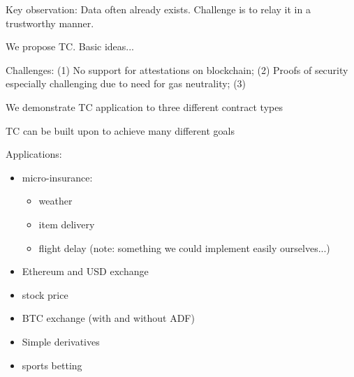 Key observation: Data often already exists. Challenge is to relay it in a trustworthy manner.

We propose TC. Basic ideas...

Challenges: (1) No support for attestations on blockchain; (2) Proofs of security especially challenging due to need for gas neutrality; (3) 

We demonstrate TC application to three different contract types

TC can be built upon to achieve many different goals 




Applications:
\begin{itemize}
\item micro-insurance:
    \begin{itemize}
    \item weather
    \item item delivery
    \item flight delay (note: something we could implement easily ourselves...)
    \end{itemize}
\item Ethereum and USD exchange
\item stock price
\item BTC exchange (with and without ADF)
\item Simple derivatives
\item sports betting
\end{itemize}

